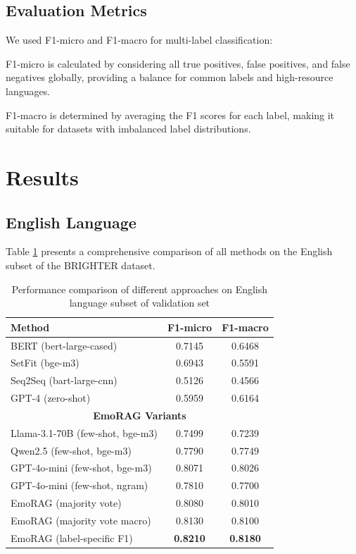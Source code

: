 \documentclass[a4paper,12pt]{extarticle}
\begin{document}
\subsection{Evaluation Metrics}

We used F1-micro and F1-macro for multi-label classification:

F1-micro is calculated by considering all true positives, false positives, and false negatives globally, providing a balance for common labels and high-resource languages.

F1-macro is determined by averaging the F1 scores for each label, making it suitable for datasets with imbalanced label distributions.

\section{Results}

\subsection{English Language}

Table \ref{tab:english_comparison} presents a comprehensive comparison of all methods on the English subset of the BRIGHTER dataset.

\begin{table}[h]
\centering
\begin{tabular}{lcc}
\toprule
\textbf{Method} & \textbf{F1-micro} & \textbf{F1-macro} \\
\midrule
BERT (bert-large-cased) & 0.7145 & 0.6468 \\
SetFit (bge-m3) & 0.6943 & 0.5591 \\
Seq2Seq (bart-large-cnn) & 0.5126 & 0.4566 \\
GPT-4 (zero-shot) & 0.5959 & 0.6164 \\
\midrule
\multicolumn{3}{c}{\textbf{EmoRAG Variants}} \\
\midrule
Llama-3.1-70B (few-shot, bge-m3) & 0.7499 & 0.7239 \\
Qwen2.5 (few-shot, bge-m3) & 0.7790 & 0.7749 \\
GPT-4o-mini (few-shot, bge-m3) & 0.8071 & 0.8026 \\
GPT-4o-mini (few-shot, ngram) & 0.7810 & 0.7700 \\
EmoRAG (majority vote) & 0.8080 & 0.8010 \\
EmoRAG (majority vote macro) & 0.8130 & 0.8100 \\
EmoRAG (label-specific F1) & \textbf{0.8210} & \textbf{0.8180} \\
\bottomrule
\end{tabular}
\caption{Performance comparison of different approaches on English language subset of validation set}
\label{tab:english_comparison}
\end{table}
\end{document}
